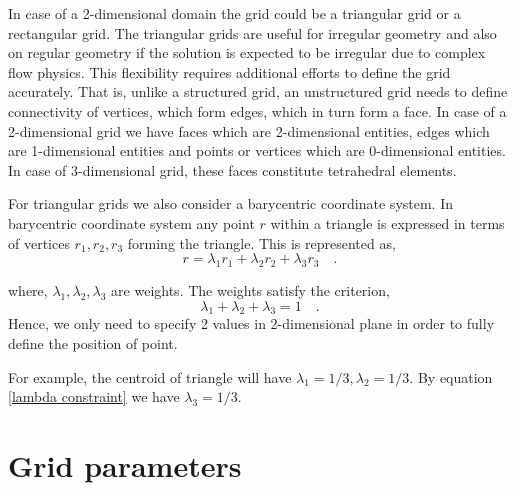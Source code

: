 \documentclass[a4paper]{book}
\begin{document}
In case of a 2-dimensional domain the grid could be a triangular grid or a rectangular grid. The triangular grids are useful for irregular geometry and also on regular geometry if the solution is expected to be irregular due to complex flow physics. This flexibility requires additional efforts to define the grid accurately. That is, unlike a structured grid, an unstructured grid needs to define connectivity of vertices, which form edges, which in turn form a face. In case of a 2-dimensional grid we have faces which are 2-dimensional entities, edges which are 1-dimensional entities and points or vertices which are 0-dimensional entities. In case of 3-dimensional grid, these faces constitute tetrahedral elements. 

For triangular grids we also consider a barycentric coordinate system. In barycentric coordinate system any point $r$ within a triangle is expressed in terms of vertices $r_1,r_2,r_3$ forming the triangle. This is represented as, \begin{equation}\label{barycentric point}
r = \lambda_1 r_1 + \lambda_2 r_2 + \lambda_3 r_3 \quad \textrm{.}
\end{equation}

where, $\lambda_1, \lambda_2, \lambda_3$ are weights. The weights satisfy the criterion, 
\begin{equation}\label{lambda constraint} 
\lambda_1 + \lambda_2 + \lambda_3 = 1 \quad \textrm{.}
\end{equation}
Hence, we only need to specify 2 values in 2-dimensional plane in order to fully define the position of point.

For example, the centroid of triangle will have $\lambda_1 = 1/3, \lambda_2 = 1/3$. By equation \eqref{lambda constraint} we have $\lambda_3=1/3$.

\section{Grid parameters}
\end{document}
